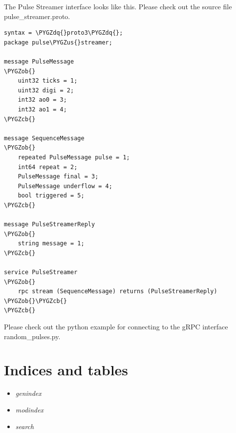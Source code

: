 \documentclass[letterpaper,10pt,english]{sphinxmanual}
\def\PYGZus{\char`\_}
\def\PYGZob{\char`\{}
\def\PYGZcb{\char`\}}
\def\PYGZdq{\char`\"}
\begin{document}
The Pulse Streamer interface looks like this. Please check out the source file
pulse\_streamer.proto.

\begin{Verbatim}[commandchars=\\\{\}]
syntax = \PYGZdq{}proto3\PYGZdq{};
package pulse\PYGZus{}streamer;

message PulseMessage
\PYGZob{}
    uint32 ticks = 1;
    uint32 digi = 2;
    int32 ao0 = 3;
    int32 ao1 = 4;
\PYGZcb{}

message SequenceMessage
\PYGZob{}
    repeated PulseMessage pulse = 1;
    int64 repeat = 2;
    PulseMessage final = 3;
    PulseMessage underflow = 4;
    bool triggered = 5;
\PYGZcb{}

message PulseStreamerReply
\PYGZob{}
    string message = 1;
\PYGZcb{}

service PulseStreamer
\PYGZob{}
    rpc stream (SequenceMessage) returns (PulseStreamerReply) \PYGZob{}\PYGZcb{}
\PYGZcb{}
\end{Verbatim}

Please check out the python example for connecting to the gRPC interface
random\_pulses.py.


\chapter{Indices and tables}
\label{index:indices-and-tables}\begin{itemize}
\item {} 
\emph{genindex}

\item {} 
\emph{modindex}

\item {} 
\emph{search}

\end{itemize}



\renewcommand{\indexname}{Index}
\printindex
\end{document}
